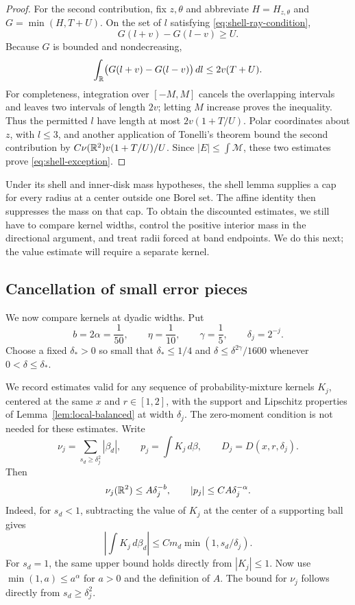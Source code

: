 \begin{proof}
For the second contribution, fix $z,\theta$ and abbreviate
$H=H_{z,\theta}$ and $G=\min(H,T+U)$. On the set of $l$ satisfying
\eqref{eq:shell-ray-condition},
\[
G(l+v)-G(l-v)\ge U.
\]
Because $G$ is bounded and nondecreasing,
\[
\int_{\mathbb R}\bigl(G(l+v)-G(l-v)\bigr)\,dl\le2v(T+U).
\]
For completeness, integration over $[-M,M]$ cancels the overlapping
intervals and leaves two intervals of length $2v$; letting $M$ increase
proves the inequality. Thus the permitted $l$ have length at most
$2v(1+T/U)$. Polar coordinates about $z$, with $l\le3$, and another
application of Tonelli's theorem bound the second contribution by
$C\nu(\mathbb R^2)v(1+T/U)/U$. Since $|E|\le\int\mathcal M$, these two
estimates prove \eqref{eq:shell-exception}.
\end{proof}


Under its shell and inner-disk mass hypotheses, the shell lemma
supplies a cap for every radius at a center outside one Borel set. The affine identity then suppresses the mass on that
cap. To obtain the discounted estimates, we still have to compare
kernel widths, control the positive interior mass in the directional
argument, and treat radii forced at band endpoints. We do this next;
the value estimate will require a separate kernel.

\subsection{Cancellation of small error pieces}

We now compare kernels at dyadic widths. Put
\begin{equation}\label{eq:local-exponents}
b=2\alpha=\frac1{50},\qquad
\eta=\frac1{10},\qquad \gamma=\frac15,
\qquad \delta_j=2^{-j}.
\end{equation}
Choose a fixed $\delta_*>0$ so small that $\delta_*\le1/4$ and
$\delta\le\delta^{2\gamma}/1600$ whenever $0<\delta\le\delta_*$.

We record estimates valid for any sequence of probability-mixture
kernels $K_j$, centered at the same $x$ and $r\in[1,2]$, with the
support and Lipschitz properties of Lemma~\ref{lem:local-balanced} at
width $\delta_j$. The zero-moment condition is not needed for these
estimates. Write
\begin{equation}\label{eq:local-coarse-measure}
\nu_j=\sum_{s_d\ge\delta_j^2}|\beta_d|,
\qquad p_j=\int K_j\,d\beta,
\qquad D_j=D(x,r,\delta_j).
\end{equation}
Then
\begin{equation}\label{eq:local-basic-cancellation}
\nu_j(\mathbb R^2)\le A\delta_j^{-b},
\qquad |p_j|\le C A\delta_j^{-\alpha}.
\end{equation}
Indeed, for $s_d<1$, subtracting the value of $K_j$ at the center of
a supporting ball gives
\[
\left|\int K_j\,d\beta_d\right|
 \le C m_d\min(1,s_d/\delta_j).
\]
For $s_d=1$, the same upper bound holds directly from $|K_j|\le1$.
Now use $\min(1,a)\le a^\alpha$ for $a>0$ and the definition of $A$.
The bound for $\nu_j$ follows directly from $s_d\ge\delta_j^2$.

